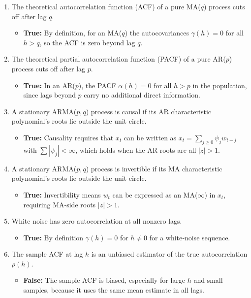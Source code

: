 \documentclass[11pt]{article}
\begin{document}
\begin{enumerate}
  \item The theoretical autocorrelation function (ACF) of a pure MA($q$) process cuts off after lag $q$.
  \begin{itemize}
    \item \textbf{True:}  By definition, for an MA($q$) the autocovariances $\gamma(h)=0$ for all $h>q$, so the ACF is zero beyond lag $q$.
  \end{itemize}

  \item The theoretical partial autocorrelation function (PACF) of a pure AR($p$) process cuts off after lag $p$.
  \begin{itemize}
    \item \textbf{True:}  In an AR($p$), the PACF $\alpha(h)=0$ for all $h>p$ in the population, since lags beyond $p$ carry no additional direct information.
  \end{itemize}

  \item A stationary ARMA($p,q$) process is causal if its AR characteristic polynomial’s roots lie outside the unit circle.
  \begin{itemize}
    \item \textbf{True:}  Causality requires that $x_t$ can be written as $x_t=\sum_{j\ge0}\psi_j w_{t-j}$ with $\sum|\psi_j|<\infty$, which holds when the AR roots are all $|z|>1$.
  \end{itemize}

  \item A stationary ARMA($p,q$) process is invertible if its MA characteristic polynomial’s roots lie outside the unit circle.
  \begin{itemize}
    \item \textbf{True:}  Invertibility means $w_t$ can be expressed as an MA($\infty$) in $x_t$, requiring MA‐side roots $|z|>1$.
  \end{itemize}

  \item White noise has zero autocorrelation at all nonzero lags.
  \begin{itemize}
    \item \textbf{True:}  By definition $\gamma(h)=0$ for $h\neq0$ for a white‐noise sequence.
  \end{itemize}

  \item The sample ACF at lag $h$ is an unbiased estimator of the true autocorrelation $\rho(h)$.
  \begin{itemize}
    \item \textbf{False:}  The sample ACF is biased, especially for large $h$ and small samples, because it uses the same mean estimate in all lags.
  \end{itemize}


\end{enumerate}
\end{document}
